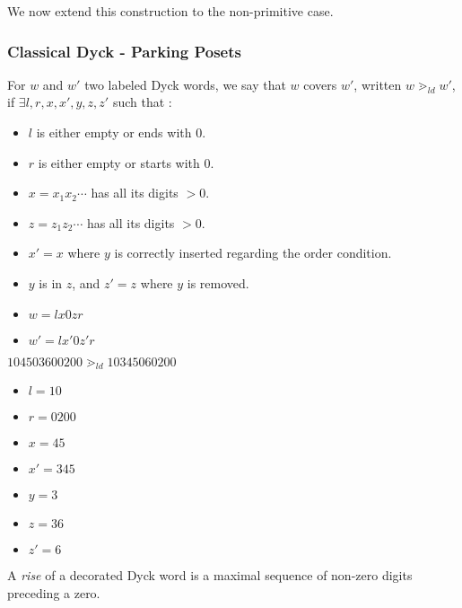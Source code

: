 We now extend this construction to the non-primitive case.

\subsubsection{Classical Dyck - Parking Posets}

\begin{definition}[$\gtrdot_{ld}$]
    For $w$ and $w'$ two labeled Dyck words, we say
    that $w$ covers $w'$, written $w \gtrdot_{ld} w'$,
    if $\exists l, r, x, x', y, z, z'$ such that :
    \begin{itemize}
        \item $l$ is either empty or ends with $0$.
        \item $r$ is either empty or starts with $0$.
        \item $x = x_1x_2 \cdots$ has all its digits $> 0$.
        \item $z = z_1z_2 \cdots$ has all its digits $> 0$.
        \item $x' = x$ where $y$ is correctly inserted
            regarding the order condition.
        \item $y$ is in $z$, and $z' = z$ where $y$ is removed.
        \item $w = lx0zr$
        \item $w' = lx'0z'r$
    \end{itemize}  
\end{definition}

\begin{example}[$n = 5$]
    $104503600200 \gtrdot_{ld} 10345060200$
    \begin{itemize}
        \item $l = 10$
        \item $r = 0200$
        \item $x = 45$
        \item $x' = 345$
        \item $y = 3$
        \item $z = 36$
        \item $z' = 6$
    \end{itemize}
    
\end{example}

\begin{definition}[Rise]
    A \emph{rise} of a decorated Dyck word is a maximal
    sequence of non-zero digits preceding a zero.
\end{definition}

